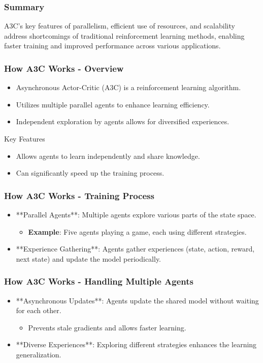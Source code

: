 \documentclass{beamer}
\begin{document}
\begin{frame}[fragile]
    \frametitle{Summary}
    A3C’s key features of parallelism, efficient use of resources, and scalability address shortcomings of traditional reinforcement learning methods, enabling faster training and improved performance across various applications.
\end{frame}

\begin{frame}[fragile]
    \frametitle{How A3C Works - Overview}
    \begin{itemize}
        \item Asynchronous Actor-Critic (A3C) is a reinforcement learning algorithm.
        \item Utilizes multiple parallel agents to enhance learning efficiency.
        \item Independent exploration by agents allows for diversified experiences.
    \end{itemize}
    \begin{block}{Key Features}
        \begin{itemize}
            \item Allows agents to learn independently and share knowledge.
            \item Can significantly speed up the training process.
        \end{itemize}
    \end{block}
\end{frame}

\begin{frame}[fragile]
    \frametitle{How A3C Works - Training Process}
    \begin{itemize}
        \item **Parallel Agents**: Multiple agents explore various parts of the state space.
            \begin{itemize}
                \item \textbf{Example}: Five agents playing a game, each using different strategies.
            \end{itemize}
        \item **Experience Gathering**: Agents gather experiences (state, action, reward, next state) and update the model periodically.
    \end{itemize}
\end{frame}

\begin{frame}[fragile]
    \frametitle{How A3C Works - Handling Multiple Agents}
    \begin{itemize}
        \item **Asynchronous Updates**: Agents update the shared model without waiting for each other.
            \begin{itemize}
                \item Prevents stale gradients and allows faster learning.
            \end{itemize}
        \item **Diverse Experiences**: Exploring different strategies enhances the learning generalization.
    \end{itemize}
\end{frame}
\end{document}
